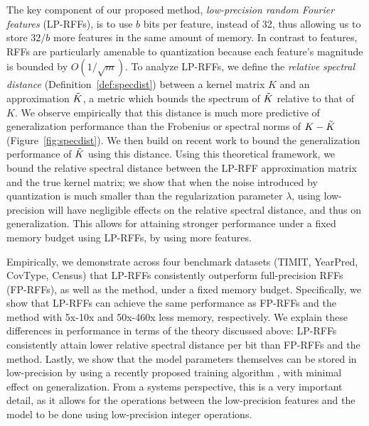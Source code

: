 The key component of our proposed method, \textit{low-precision random Fourier features} (LP-RFFs), is to use $b$ bits per feature, instead of 32, thus allowing us to store $32/b$ more features in the same amount of memory. In contrast to \Nystrom features, RFFs are particularly amenable to quantization because each feature's magnitude is bounded by $O(1/\sqrt{m})$.
To analyze LP-RFFs, we define the \textit{relative spectral distance} (Definition~\ref{def:specdist}) between a kernel matrix $K$ and an approximation $\tilde{K}$, a metric which bounds the spectrum of $\tilde{K}$ relative to that of $K$. We observe empirically that this distance is much more predictive of generalization performance than the Frobenius or spectral norms of $K-\tilde{K}$ (Figure~\ref{fig:specdist}). We then build on recent work \citep{avron17,musco17} to bound the generalization performance of $\tilde{K}$ using this distance. Using this theoretical framework, we bound the relative spectral distance between the LP-RFF approximation matrix and the true kernel matrix; we show that when the noise introduced by quantization is much smaller than the regularization parameter $\lambda$, using low-precision will have negligible effects on the relative spectral distance, and thus on generalization. This allows for attaining stronger performance under a fixed memory budget using LP-RFFs, by using more features.

Empirically, we demonstrate across four benchmark datasets (TIMIT, YearPred, CovType, Census) that LP-RFFs consistently outperform full-precision RFFs (FP-RFFs), as well as the \Nystrom method, under a fixed memory budget. Specifically, we show that LP-RFFs can achieve the same performance as FP-RFFs and the \Nystrom method with 5x-10x and 50x-460x less memory, respectively. We explain these differences in performance in terms of the theory discussed above: LP-RFFs consistently attain lower relative spectral distance per bit than FP-RFFs and the \Nystrom method. Lastly, we show that the model parameters themselves can be stored in low-precision by using a recently proposed training algorithm \citep{halp18}, with minimal effect on generalization. From a systems perspective, this is a very important detail, as it allows for the operations between the low-precision features and the model to be done using low-precision integer operations.

